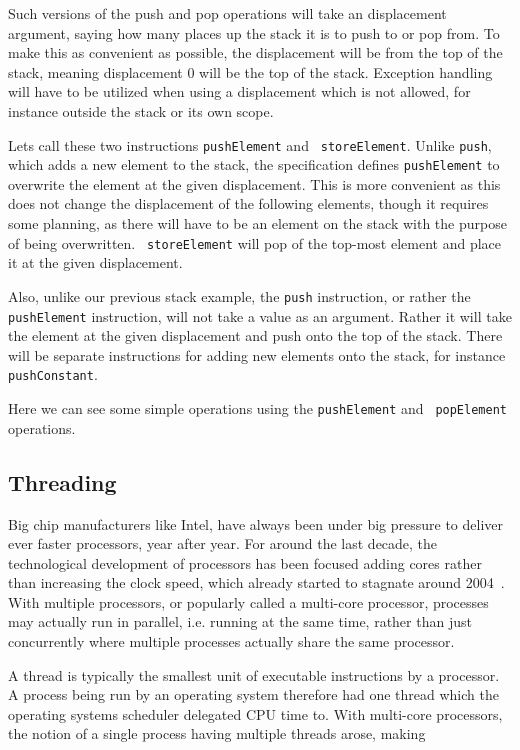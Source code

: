 Such versions of the push and pop operations will take an displacement argument,
saying how many places up the stack it is to push to or pop from. To make this
as convenient as possible, the displacement will be from the top of the stack,
meaning displacement 0 will be the top of the stack. Exception handling will
have to be utilized when using a displacement which is not allowed, for instance
outside the stack or its own scope.

Lets call these two instructions {\tt pushElement} and {\tt
  storeElement}. Unlike {\tt push}, which adds a new element to the stack, the
specification defines {\tt pushElement} to overwrite the element at the given
displacement. This is more convenient as this does not change the displacement
of the following elements, though it requires some planning, as there will have
to be an element on the stack with the purpose of being overwritten. {\tt
  storeElement} will pop of the top-most element and place it at the given
displacement.

Also, unlike our previous stack example, the {\tt push} instruction, or rather
the {\tt pushElement} instruction, will not take a value as an argument. Rather
it will take the element at the given displacement and push onto the top of the
stack. There will be separate instructions for adding new elements onto the
stack, for instance {\tt pushConstant}.

Here we can see some simple operations using the {\tt pushElement} and {\tt
  popElement} operations.
\begin{stackops}
\end{stackops}


\subsection{Threading}
\label{sec:design:threading}
Big chip manufacturers like Intel, have always been under big pressure to
deliver ever faster processors, year after year. For around the last decade, the
technological development of processors has been focused adding cores rather
than increasing the clock speed, which already started to stagnate around
2004~\cite{sutter}. With multiple processors, or popularly called a multi-core
processor, processes may actually run in parallel, i.e. running at the same
time, rather than just concurrently where multiple processes actually share the
same processor.

A thread is typically the smallest unit of executable instructions by a
processor. A process being run by an operating system therefore had one thread
which the operating systems scheduler delegated CPU time to. With multi-core
processors, the notion of a single process having multiple threads arose, making

